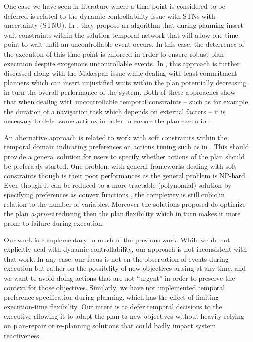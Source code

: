 One case we have seen in literature where a time-point is
considered to be deferred is related to the dynamic controllability
issue with STNs with uncertainty (STNU). In \cite{morris01}, they propose 
an algorithm that during planning insert wait constraints within the
solution temporal network that will allow one time-point to wait until
an uncontrollable event occurs. In this case, the deterrence of the
execution of this time-point is enforced in order to ensure robust plan
execution despite exogenous uncontrollable events. In
\cite{gallien2006},  this approach is further discussed along with the
Makespan issue while dealing with least-commitment planners which can
insert unjustified waits within the plan potentially decreasing in turn the
overall performance of the system. Both of these approaches show that
when dealing with uncontrollable temporal constraints -- such as for
example the duration of a navigation task which depends on external
factors -- it is necessary to defer some actions in order to ensure
the plan execution. 

An alternative approach is related to work with soft constraints
within the temporal domain indicating preferences on actions timing
such as in \cite{khatib2001temporal}. This should provide  a general
solution for users to specify whether actions of the plan should be
preferably started. One problem with general frameworks dealing with
soft constraints though is their poor performances \cite{bartak2002}
as the general problem is NP-hard. Even though it can be reduced to a
more tractable (polynomial) solution by specifying preferences as
convex functions \cite{rossi2006learning}, the  
complexity is still cubic in relation to the number of
variables. Moreover the solutions proposed do optimize the plan {\em
  a-priori} reducing then the plan flexibility which in turn makes it
more prone to failure during execution.

Our work is complementary to much of the previous work.  While we do
not explicitly deal with dynamic controllability, our approach is not
inconsistent with that work.  In any case, our focus is not on the
observation of events during execution but rather on the possibility
of new objectives arising at any time, and we want to avoid doing
actions that are not ``urgent'' in order to preserve the context for
those objectives.  Similarly, we have not implemented temporal
preference specification during planning, which has the effect of
limiting execution-time flexibility.  Our intent is to defer temporal
decisions to the executive allowing it to adapt the plan to new
objectives without heavily relying on plan-repair or re-planning
solutions that could badly impact system reactiveness.


